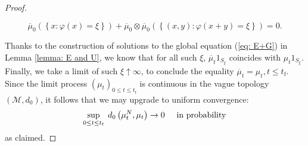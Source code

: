 \documentclass[11pt, notitlepage]{article}
\begin{document}
\begin{proof}
\begin{enumerate}[label=\roman{*}).]
\begin{equation}
   \overline{\mu}_0\left(\left\{x\colon \varphi(x) = \xi\right\}\right) + 
    \overline{\mu}_0 \otimes \overline{\mu}_0 \left(\left\{(x,y) \colon \varphi(x+y) = \xi\right\}\right) = 0. 
\end{equation} \end{enumerate} Thanks to the construction of solutions to the global equation (\ref{eq: E+G}) in Lemma \ref{lemma: E and U}, we know that for all such $\xi$, $\overline{\mu}_t1_{S_\xi}$ coincides with $\mu_t1_{S_\xi}$. Finally, we take a limit of such $\xi \uparrow \infty$, to conclude the equality $\overline{\mu}_t=\mu_t, t\le t_\mathrm{f}$.  Since the limit process $(\mu_t)_{0\le t\le t_\mathrm{f}}$ is continuous in the vague topology $(\mathcal{M},d_0)$, it follows that we may upgrade to uniform convergence: \begin{equation} \sup_{0\le t\le t_\mathrm{f}}\hspace{0.1cm}d_0\left(\mu^N_t, \mu_t\right) \rightarrow 0 \hspace{0.5cm} \text{in probability}  \end{equation} as claimed.  
\end{proof} 
\end{document}
